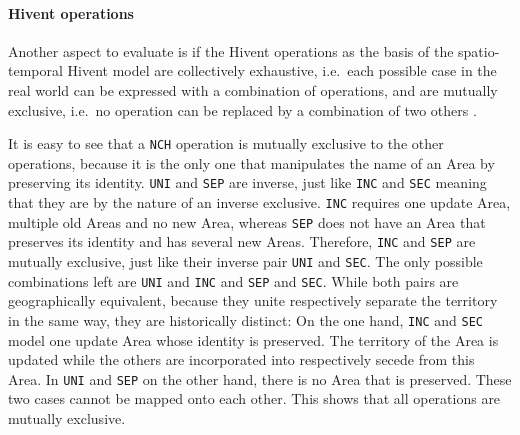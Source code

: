 
\paragraph{Hivent operations} %
\label{par:hivent_operations}

Another aspect to evaluate is if the Hivent operations as the basis of the spatio-temporal Hivent model are collectively exhaustive, i.e.\ each possible case in the real world can be expressed with a combination of operations, and are mutually exclusive, i.e.\ no operation can be replaced by a combination of two others \cite{mece}.

It is easy to see that a \texttt{NCH} operation is mutually exclusive to the other operations, because it is the only one that manipulates the name of an Area by preserving its identity. \texttt{UNI} and \texttt{SEP} are inverse, just like \texttt{INC} and \texttt{SEC} meaning that they are by the nature of an inverse exclusive. \texttt{INC} requires one update Area, multiple old Areas and no new Area, whereas \texttt{SEP} does not have an Area that preserves its identity and has several new Areas. Therefore, \texttt{INC} and \texttt{SEP} are mutually exclusive, just like their inverse pair \texttt{UNI} and \texttt{SEC}.
The only possible combinations left are \texttt{UNI} and \texttt{INC} and \texttt{SEP} and \texttt{SEC}. While both pairs are geographically equivalent, because they unite respectively separate the territory in the same way, they are historically distinct: On the one hand, \texttt{INC} and \texttt{SEC} model one update Area whose identity is preserved. The territory of the Area is updated while the others are incorporated into respectively secede from this Area. In \texttt{UNI} and \texttt{SEP} on the other hand, there is no Area that is preserved. These two cases cannot be mapped onto each other. This shows that all operations are mutually exclusive.


